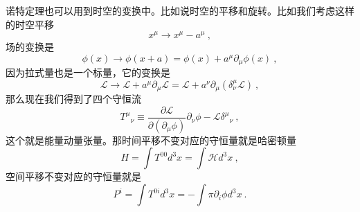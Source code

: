 诺特定理也可以用到时空的变换中。比如说时空的平移和旋转。比如我们考虑这样的时空平移
\begin{equation}
x^\mu \rightarrow x^\mu - a^\mu~,
\end{equation}
场的变换是
\begin{equation}
\phi(x) \rightarrow \phi (x+a) = \phi (x) + a^\mu \partial_\mu \phi(x)~,
\end{equation}
因为拉式量也是一个标量，它的变换是
\begin{equation}
\mathcal L \rightarrow \mathcal L + a^\mu \partial_\mu \mathcal L  = \mathcal L + a^\nu \partial_\mu (\delta^\mu_\nu \mathcal L)~,
\end{equation}
那么现在我们得到了四个守恒流
\begin{equation}\label{eq_classi_2}
T^\mu{}_\nu \equiv \frac{\partial \mathcal L}{\partial (\partial_\mu \phi)} \partial_\nu \phi - \mathcal L \delta^\mu{}_\nu~,
\end{equation}
这个就是能量动量张量。那时间平移不变对应的守恒量就是哈密顿量
\begin{equation}
H = \int T^{00} d^3 x = \int \mathcal H d^3 x~,
\end{equation}
空间平移不变对应的守恒量就是
\begin{equation}
P^i = \int T^{0i} d^3x = - \int \pi \partial_i \phi d^3 x ~.
\end{equation}
















